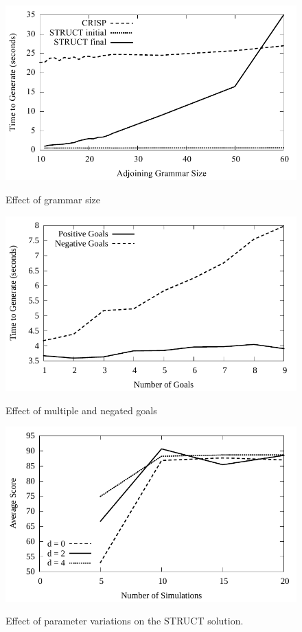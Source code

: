 \begin{figure}
\centering
\includegraphics[width=0.7 \linewidth]{../analysis/plots/large-grammar/large-grammar.pdf}
\label{graph-large-grammars}
\caption{Effect of grammar size}
\end{figure}

\begin{figure}
\centering
\includegraphics[width=0.7 \linewidth]{../analysis/plots/goals/differentgoals.pdf}
\label{chart-different-goals}
\caption{Effect of multiple and negated goals}
\end{figure}

\begin{figure}
\centering
\includegraphics[width=0.7 \linewidth]{../analysis/plots/params/pltag-n-v-score.pdf}
\label{chart-n-v-score}
\caption{Effect of parameter variations on the STRUCT solution.}
\end{figure}


